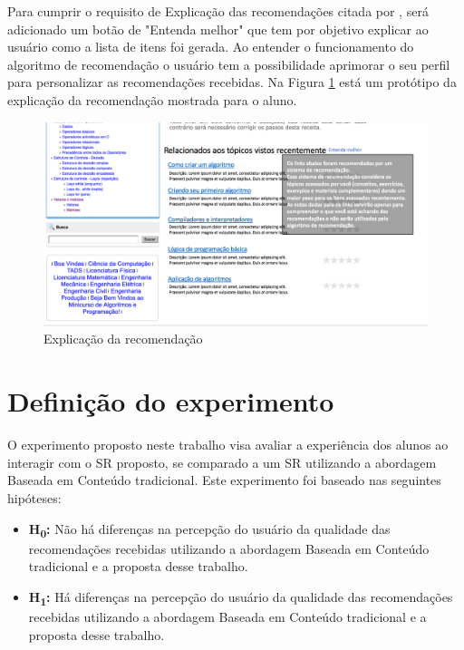 Para cumprir o requisito de Explicação das recomendações citada por , será adicionado um
botão de "Entenda melhor" que tem por objetivo explicar ao usuário como a lista de itens foi gerada. Ao entender o
funcionamento do algoritmo de recomendação o usuário tem a possibilidade aprimorar o seu perfil para personalizar as
recomendações recebidas. Na Figura \ref{fig:adaptweb-proposta-explicacao} está um protótipo da explicação da recomendação
mostrada para o aluno.

\begin{figure}[htb]
  \caption{\label{fig:adaptweb-proposta-explicacao}Explicação da recomendação}
  \begin{center}
      \includegraphics[scale=0.6]{./Figuras/explicacoes_v2.png}
  \end{center}
\end{figure}

\section{Definição do experimento}

O experimento proposto neste trabalho visa avaliar a experiência dos alunos ao interagir com o SR proposto, se comparado a um SR
utilizando a abordagem Baseada em Conteúdo tradicional. Este experimento foi
baseado nas seguintes hipóteses:

\begin{itemize}
\item \textbf{H\textsubscript{0}:} Não há diferenças na percepção do usuário da qualidade das recomendações recebidas utilizando a abordagem
Baseada em Conteúdo tradicional e a proposta desse trabalho.
\item \textbf{H\textsubscript{1}:} Há diferenças na percepção do usuário da qualidade das recomendações recebidas utilizando a abordagem
Baseada em Conteúdo tradicional e a proposta desse trabalho.
\end{itemize}

